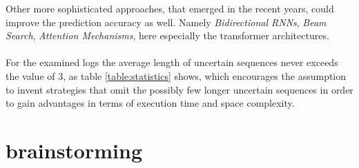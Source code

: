 \documentclass[
	a4paper,
	pagesize,
	pdftex,
	12pt,
	ngerman,
	fleqn,
	final,
	]{scrartcl}
\theoremstyle{plain}
\theoremstyle{definition}
\begin{document}
		Other more sophisticated approaches, that emerged in the recent years, could improve the prediction accuracy as well. Namely \textit{Bidirectional RNNs}, \textit{Beam Search}, \textit{Attention Mechanisms}, here especially the transformer architectures. \cite{geron2019hands}\\
		\\
		For the examined logs the average length of uncertain sequences never exceeds the value of 3, as table \ref{table:statistics} shows, which encourages the assumption to invent strategies that omit the possibly few longer uncertain sequences in order to gain advantages in terms of execution time and space complexity.
	
	

\section{brainstorming}	
\end{document}
